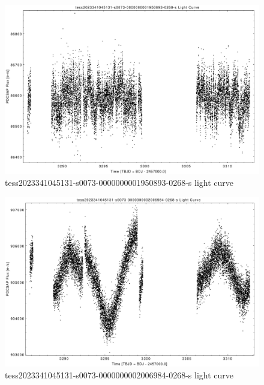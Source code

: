 \documentclass[a4paper,12pt]{article}
\begin{document}
\begin{figure}[htbp]
    \centering
    \includegraphics[width = 1\textwidth]{
      ../lightcurves/tess2023341045131-s0073-0000000001950893-0268-s.pdf}
    \caption{tess2023341045131-s0073-0000000001950893-0268-s light curve}
\end{figure}
\begin{figure}[htbp]
    \centering
    \includegraphics[width = 1\textwidth]{
      ../lightcurves/tess2023341045131-s0073-0000000002006984-0268-s.pdf}
    \caption{tess2023341045131-s0073-0000000002006984-0268-s light curve}
\end{figure}
\end{document}
